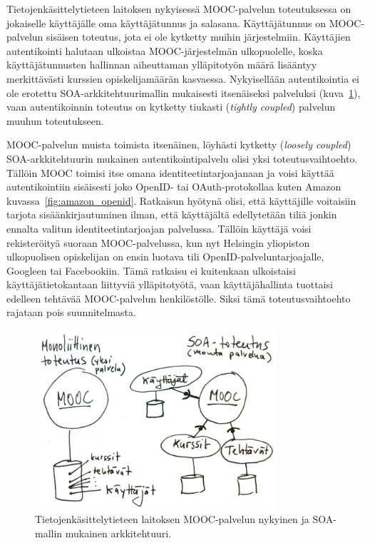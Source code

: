 \documentclass[finnish,gradu]{tktltiki}
\begin{document}
  Tietojenkäsittelytieteen laitoksen nykyisessä MOOC-palvelun toteutuksessa on jokaiselle käyttäjälle oma käyttäjätunnus ja salasana. Käyttäjätunnus on MOOC-palvelun sisäisen toteutus, jota ei ole kytketty muihin järjestelmiin. Käyttäjien autentikointi halutaan ulkoistaa MOOC-järjestelmän ulkopuolelle, koska käyttäjätunnusten hallinnan aiheuttaman ylläpitotyön määrä lisääntyy merkittävästi kurssien opiskelijamäärän kasvaessa. Nykyisellään autentikointia ei ole erotettu SOA-arkkitehtuurimallin mukaisesti itsenäiseksi palveluksi (kuva~\ref{fig:mooc-arkkitehtuuri}), vaan autentikoinnin toteutus on kytketty tiukasti (\emph{tightly coupled}) palvelun muuhun toteutukseen.

  MOOC-palvelun muista toimista itsenäinen, löyhästi kytketty (\emph{loosely coupled}) SOA-arkkitehtuurin mukainen autentikointipalvelu olisi yksi toteutusvaihtoehto. Tällöin MOOC toimisi itse omana identiteetintarjoajanaan ja voisi käyttää autentikointiin sisäisesti joko OpenID- tai OAuth-protokollaa kuten Amazon kuvassa~\ref{fig:amazon_openid}. Ratkaisun hyötynä olisi, että käyttäjille voitaisiin tarjota sisäänkirjautuminen ilman, että käyttäjältä edellytetään tiliä jonkin ennalta valitun identiteetintarjoajan palvelussa. Tällöin käyttäjä voisi rekisteröityä suoraan MOOC-palvelussa, kun nyt Helsingin yliopiston ulkopuolisen opiskelijan on ensin luotava tili OpenID-palveluntarjoajalle, Googleen tai Facebookiin. Tämä ratkaisu ei kuitenkaan ulkoistaisi käyttäjätietokantaan liittyviä ylläpitotyötä, vaan käyttäjähallinta tuottaisi edelleen tehtävää MOOC-palvelun henkilöstölle. Siksi tämä toteutusvaihtoehto rajataan pois suunnitelmasta.

  \begin{figure}[h!]
    \centering
    \includegraphics[width=0.8\textwidth]{images/mooc-arkkitehtuuri.jpg}
    \caption{Tietojenkäsittelytieteen laitoksen MOOC-palvelun nykyinen ja SOA-mallin mukainen arkkitehtuuri.}
    \label{fig:mooc-arkkitehtuuri}
  \end{figure}
\end{document}
